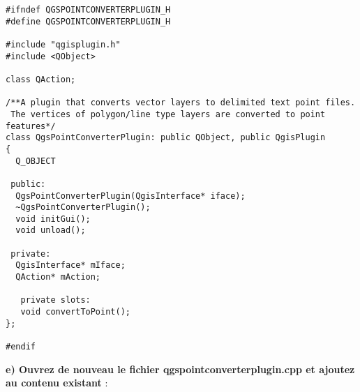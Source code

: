 \begin{verbatim}
#ifndef QGSPOINTCONVERTERPLUGIN_H
#define QGSPOINTCONVERTERPLUGIN_H

#include "qgisplugin.h"
#include <QObject>

class QAction;

/**A plugin that converts vector layers to delimited text point files.
 The vertices of polygon/line type layers are converted to point features*/
class QgsPointConverterPlugin: public QObject, public QgisPlugin
{
  Q_OBJECT

 public:
  QgsPointConverterPlugin(QgisInterface* iface);
  ~QgsPointConverterPlugin();
  void initGui();
  void unload();
  
 private:
  QgisInterface* mIface;
  QAction* mAction;
  
   private slots:
   void convertToPoint();
};

#endif
\end{verbatim}

\textbf{e) Ouvrez de nouveau le fichier qgspointconverterplugin.cpp et ajoutez 
au contenu existant} :

